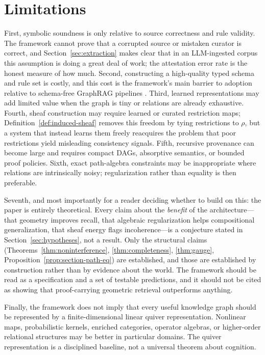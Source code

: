 \documentclass[11pt]{article}
\begin{document}
\section{Limitations}

First, symbolic soundness is only relative to source correctness and rule validity. The framework cannot prove that a corrupted source or mistaken curator is correct, and Section~\ref{sec:extraction} makes clear that in an LLM-ingested corpus this assumption is doing a great deal of work; the attestation error rate is the honest measure of how much. Second, constructing a high-quality typed schema and rule set is costly, and this cost is the framework's main barrier to adoption relative to schema-free GraphRAG pipelines \citep{edge2024,gutierrez2024}. Third, learned representations may add limited value when the graph is tiny or relations are already exhaustive. Fourth, sheaf construction may require learned or curated restriction maps; Definition~\ref{def:induced-sheaf} removes this freedom by tying restrictions to $\rho$, but a system that instead learns them freely reacquires the problem that poor restrictions yield misleading consistency signals. Fifth, recursive provenance can become large and requires compact DAGs, absorptive semantics, or bounded proof policies. Sixth, exact path-algebra constraints may be inappropriate where relations are intrinsically noisy; regularization rather than equality is then preferable.

Seventh, and most importantly for a reader deciding whether to build on this: the paper is entirely theoretical. Every claim about the \emph{benefit} of the architecture---that geometry improves recall, that algebraic regularization helps compositional generalization, that sheaf energy flags incoherence---is a conjecture stated in Section~\ref{sec:hypotheses}, not a result. Only the structural claims (Theorems~\ref{thm:noninterference}, \ref{thm:completeness}, \ref{thm:gauge}, Proposition~\ref{prop:section-path-eq}) are established, and those are established by construction rather than by evidence about the world. The framework should be read as a specification and a set of testable predictions, and it should not be cited as showing that proof-carrying geometric retrieval outperforms anything.

Finally, the framework does not imply that every useful knowledge graph should be represented by a finite-dimensional linear quiver representation. Nonlinear maps, probabilistic kernels, enriched categories, operator algebras, or higher-order relational structures may be better in particular domains. The quiver representation is a disciplined baseline, not a universal theorem about cognition.
\end{document}
